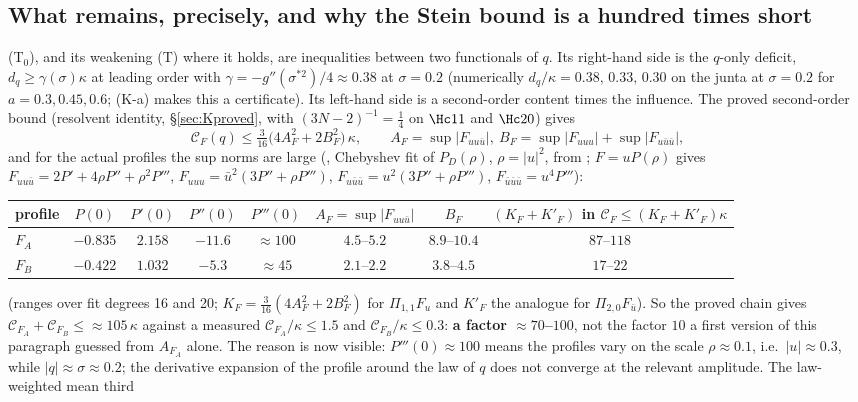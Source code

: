 \subsection{What remains, precisely, and why the Stein bound is a hundred times short}\label{sec:wct-remains}
(T$_0$), and its weakening (T) where it holds, are inequalities between two functionals of $q$. Its right-hand side is the $q$-only deficit, $d_q\ge\gamma(\sigma)\kappa$ at leading order with $\gamma=-g''(\sigma^{*2})/4\approx0.38$ at
$\sigma=0.2$ (numerically $d_q/\kappa=0.38,\,0.33,\,0.30$ on the junta at $\sigma=0.2$ for $a=0.3,0.45,0.6$; (K-a) makes this a certificate). Its left-hand side is a second-order content times the
influence. The proved second-order bound (resolvent identity, \S\ref{sec:Kproved}, with $(3N-2)^{-1}=\frac14$ on $\Hc11$ and $\Hc20$) gives
\[
\mathcal C_F(q)\le\tfrac3{16}\bigl(4A_F^2+2B_F^2\bigr)\,\kappa,\qquad A_F=\sup|F_{uu\bar u}|,\ B_F=\sup|F_{uuu}|+\sup|F_{u\bar u\bar u}|,
\]
and for the actual profiles the sup norms are large (, Chebyshev fit of $P_D(\rho)$, $\rho=|u|^2$, from ; $F=uP(\rho)$ gives
$F_{uu\bar u}=2P'+4\rho P''+\rho^2P'''$, $F_{uuu}=\bar u^2(3P''+\rho P''')$, $F_{u\bar u\bar u}=u^2(3P''+\rho P''')$, $F_{\bar u\bar u\bar u}=u^4P'''$):
\begin{center}\small
\begin{tabular}{lccccccc}\toprule
profile & $P(0)$ & $P'(0)$ & $P''(0)$ & $P'''(0)$ & $A_F=\sup|F_{uu\bar u}|$ & $B_F$ & $(K_F+K'_F)$ in $\mathcal C_F\le(K_F+K'_F)\kappa$\\\midrule
$F_A$ & $-0.835$ & $2.158$ & $-11.6$ & $\approx100$ & $4.5$--$5.2$ & $8.9$--$10.4$ & $87$--$118$\\
$F_B$ & $-0.422$ & $1.032$ & $-5.3$ & $\approx45$ & $2.1$--$2.2$ & $3.8$--$4.5$ & $17$--$22$\\\bottomrule
\end{tabular}
\end{center}
(ranges over fit degrees 16 and 20; $K_F=\frac3{16}(4A_F^2+2B_F^2)$ for $\Pi_{1,1}F_u$ and $K'_F$ the analogue for $\Pi_{2,0}F_{\bar u}$). So the proved chain gives
$\mathcal C_{F_A}+\mathcal C_{F_B}\le\approx105\,\kappa$ against a measured $\mathcal C_{F_A}/\kappa\le1.5$ and $\mathcal C_{F_B}/\kappa\le0.3$: \textbf{a factor $\approx70$--$100$}, not the factor
$10$ a first version of this paragraph guessed from $A_{F_A}$ alone. The reason is now visible: $P'''(0)\approx100$ means the profiles vary on the scale $\rho\approx0.1$, i.e.\
$|u|\approx0.3$, while $|q|\approx\sigma\approx0.2$; the derivative expansion of the profile around the law of $q$ does not converge at the relevant amplitude. The law-weighted mean third
